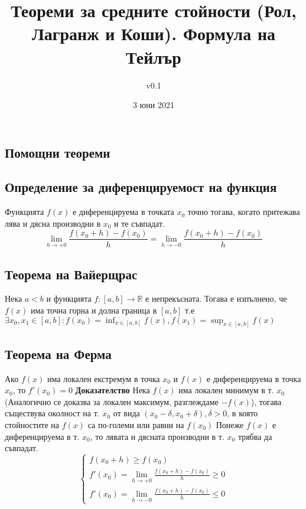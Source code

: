\documentclass[fleqn,12pt]{article}
\title{Теореми  за  средните  стойности  (Рол,  Лагранж  и  Коши).  Формула  на Тейлър}
\author{v0.1}
\date{3 юни 2021}
\begin{document}
    
\maketitle

\tableofcontents

\begin{flushleft}
    
\section{Помощни теореми}

\subsection{Определение за диференцируемост на функция}
Функцията $f(x)$ е диференцируема в точката $x_0$ точно тогава, когато притежава лява и дясна производни в $x_0$ и те съвпадат.
\[\lim_{h \to +0} \frac{f(x_0 + h)-f(x_0)}{h} = \lim_{h \to -0} \frac{ f(x_0 + h)-f(x_0)}{h}\]

\subsection{Теорема на Вайерщрас}
Нека $a<b$ и функцията $f:[a,b]\rightarrow\mathbb{R}$ е непрекъсната. Тогава е изпълнено, че $f(x)$ има точна горна и долна граница в $[a,b]$
т.е $\exists x_0,x_1 \in [a,b]: f(x_0)=\inf_{x \in [a,b]} f(x), f(x_1)=\sup_{x \in [a,b]} f(x)$

\subsection{Теорема на Ферма}
Ако $f(x)$ има локален екстремум в точка $x_0$ и $f(x)$ е диференцируема в точка $x_0$, то $f'(x_0)=0$
\bigbreak
\textbf{Доказателство}
Нека $f(x)$ има локален минимум в т. $x_0$ (Аналогично се доказва за локален максимум, разглеждаме $-f(x)$),
тогава съществува околност на т. $x_0$ от вида $(x_0 - \delta,x_0 + \delta), \delta > 0$, в която стойностите на $f(x)$ са по-големи или равни на $f(x_0)$
Понеже $f(x)$ е диференцируема в т. $x_0$, то лявата и дясната производни в т. $x_0$ трябва да съвпадат.
\[
\begin{cases}
    f(x_0 + h) \geq f(x_0)\\
    f'(x_0) = \lim_{h \to +0} \frac{ f(x_0 + h)-f(x_0)}{h} \geq 0\\
    f'(x_0) = \lim_{h \to -0} \frac{ f(x_0 + h)-f(x_0)}{h} \leq 0
\end{cases}
\]


\end{flushleft}
\end{document}
